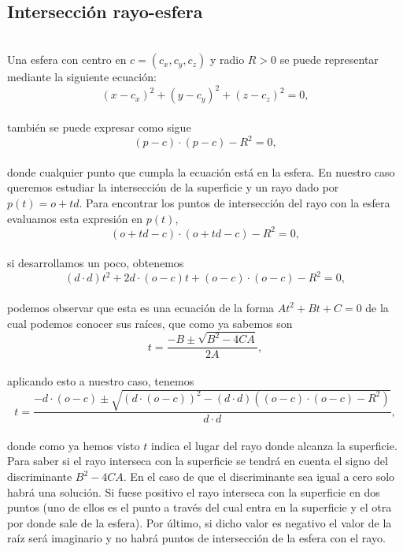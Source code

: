 ${ }$\\
\subsection{Intersección rayo-esfera}
${ }$\\

Una esfera con centro en $c = (c_x, c_y, c_z)$ y radio $R>0$ se puede representar mediante la siguiente ecuación:
${ }$\\
\[
	(x-c_x)^2 + (y-c_y)^2 + (z-c_z)^2 = 0,
\]
${ }$\\
también se puede expresar como sigue
${ }$\\
\[
	(p-c)\cdot(p-c) - R^2 = 0,
\]
${ }$\\
donde cualquier punto que cumpla la ecuación está en la esfera. En nuestro caso queremos estudiar la intersección de la superficie y un rayo dado por $p(t) = o + td$. Para encontrar los puntos de intersección del rayo con la esfera evaluamos esta expresión en $p(t)$,
${ }$\\
\[
	(o+td-c)\cdot(o+td-c) - R^2 = 0,
\]
${ }$\\
si desarrollamos un poco, obtenemos
${ }$\\
\[
	(d\cdot d)t^2 + 2d\cdot (o-c)t + (o-c)\cdot(o-c) - R^2 = 0,
\]
${ }$\\
podemos observar que esta es una ecuación de la forma $At^2+Bt+C=0$ de la cual podemos conocer sus raíces, que como ya sabemos son
${ }$\\
\[
	t = \frac{-B\pm \sqrt{B^2-4CA}}{2A},
\]
${ }$\\
aplicando esto a nuestro caso, tenemos
${ }$\\
\[
	t = \frac{-d\cdot (o-c) \pm \sqrt{(d\cdot (o-c))^2 - (d\cdot d)((o-c)\cdot(o-c)-R^2)}}{d\cdot d},
\]
${ }$\\
donde como ya hemos visto $t$ indica el lugar del rayo donde alcanza la superficie.
${ }$\\

Para saber si el rayo interseca con la superficie se tendrá en cuenta el signo del discriminante $B^2-4CA$. En el caso de que el discriminante sea igual a cero solo habrá una solución. Si fuese positivo el rayo interseca con la superficie en dos puntos (uno de ellos es el punto a través del cual entra en la superficie y el otra por donde sale de la esfera). Por último, si dicho valor es negativo el valor de la raíz será imaginario y no habrá puntos de intersección de la esfera con el rayo.
${ }$\\
	
